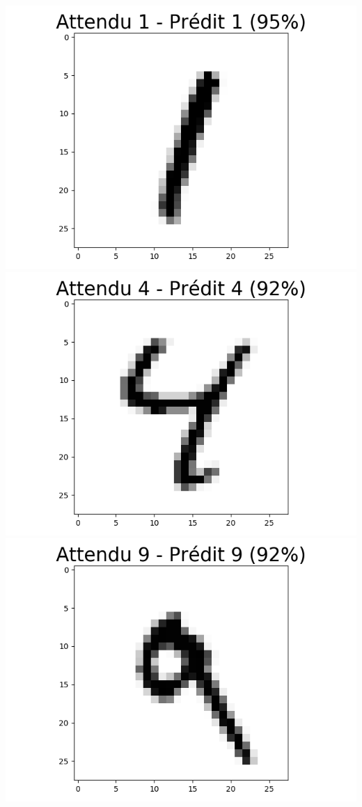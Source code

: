 \documentclass[11pt,class=report,crop=false]{standalone}
\begin{document}
\begin{center}
\includegraphics[scale=\myscale,scale=0.20]{figures/tf2-chiffre-test-result-5}
\includegraphics[scale=\myscale,scale=0.20]{figures/tf2-chiffre-test-result-6}
\includegraphics[scale=\myscale,scale=0.20]{figures/tf2-chiffre-test-result-7}

\end{center}
\end{document}
